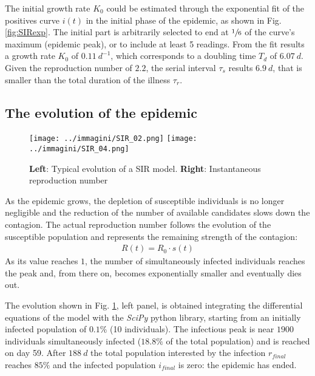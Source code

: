 \documentclass[DIV=12, BCOR=0pt]{scrartcl}  %
\begin{document}
	The initial growth rate $K_{0}$ could be estimated through the exponential fit of the positives curve $i(t)$ in the initial phase of the epidemic, as shown in Fig. \ref{fig:SIRexp}. The initial part is arbitrarily selected to end at $\sfrac{1}{6}$ of the curve's maximum (epidemic peak), or to include at least 5 readings. From the fit results a growth rate $K_{0}$ of $0.11 \ d^{-1}$, which corresponds to a doubling time $T_{d}$ of $6.07 \ d$. Given the reproduction number of $2.2$, the serial interval $\tau_{s}$ results $6.9 \ d$, that is smaller than the total duration of the illness $\tau_{r}$.



  \subsection{The evolution of the epidemic}
  
  \begin{figure}[h!]
  	\centering
  	\texttt{[image: ../immagini/SIR\_02.png]}
  	\texttt{[image: ../immagini/SIR\_04.png]}
  	\caption{\textbf{Left}: Typical evolution of a SIR model. \textbf{Right}: Instantaneous reproduction number }
  	\label{fig:SIRtot}
  \end{figure}

  As the epidemic grows, the depletion of susceptible individuals is no longer negligible and the reduction of the number of available candidates slows down the contagion.
  The actual reproduction number follows the evolution of the susceptible population and represents the remaining strength of the contagion:
  \begin{align}
		R(t) = R_{0} \cdot s(t) 
		\label{eq:Rt}
  \end{align}
  As its value reaches $1$, the number of simultaneously infected individuals reaches the peak and, from there on, becomes exponentially smaller and eventually dies out.
  
  The evolution shown in Fig. \ref{fig:SIRtot}, left panel, is obtained integrating the differential equations of the model with the \textit{SciPy} python library, starting from an initially infected population of $0.1 \%$ (10 individuals). 
  The infectious peak is near $1900$ individuals simultaneously infected ($18.8 \%$ of the total population) and is reached on day 59. After $188 \ d$ the total population interested by the infection $r_{final}$ reaches $85 \%$ and the infected population $i_{final}$ is zero: the epidemic has ended. 
  
\end{document}

